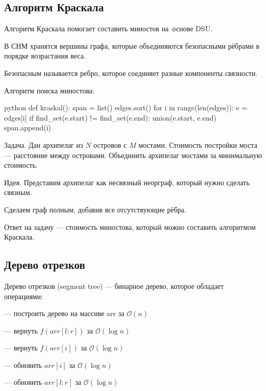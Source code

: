\subsection{Алгоритм Краскала}

{\bold Алгоритм Краскала} помогает составить {\ital миностов} на~основе {\ital DSU}.

В СНМ хранятся вершины графа, которые объединяются {\ital безопасными рёбрами} в порядке {\ital возрастания веса}.

{\bold Безопасным} называется ребро, которое соединяет {\ital разные} компоненты связности.

{\bold Алгоритм} поиска миностова:
\begin{code}{python}
def kraskal():
  span = list()
  edges.sort()
  for i in range(len(edges)):
    e = edges[i]
    if find_set(e.start) != find_set(e.end):
      union(e.start, e.end)
      span.append(i)
\end{code}

\begin{theorem}
{\bold Задача.} Дан архипелаг из $N$ островов с $M$ мостами. Стоимость постройки моста --- {\ital расстояние} между островами. Объединить архипелаг мостами за {\ital минимальную} стоимость. 
\end{theorem}

{\bold Идея.} Представим архипелаг как несвязный неорграф, который нужно сделать связным.

Сделаем граф полным, добавив все отсутствующие рёбра.

Ответ на задачу --- стоимость {\ital миностова}, который можно составить {\ital алгоритмом Краскала}.

\subsection{Дерево отрезков}

{\bold Дерево отрезков} {\ital\color{desc} (segment tree)} --- бинарное дерево, которое обладает операциями:
\begin{list*}
\item{} --- построить дерево на массиве {\ital arr} за $\mathcal{O}(n)$
\item{} --- вернуть $f(arr[l:r])$ за $\mathcal{O}(\log n)$
\item{} --- вернуть $f(arr[i])$ за $\mathcal{O}(\log n)$
\item{} --- обновить $arr[i]$ за $\mathcal{O}(\log n)$
\item{} --- обновить $arr[l:r]$ за $\mathcal{O}(\log n)$
\end{list*}


